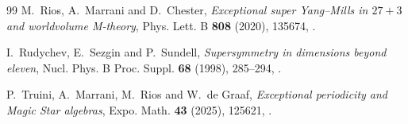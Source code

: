 \documentclass[11pt]{amsart}
\theoremstyle{remark}
\begin{document}
\begin{thebibliography}{99}
 M.~Rios, A.~Marrani and D.~Chester, \emph{Exceptional super Yang--Mills in $27+3$ and worldvolume M-theory}, Phys. Lett. B \textbf{808} (2020), 135674, .

 I.~Rudychev, E.~Sezgin and P.~Sundell, \emph{Supersymmetry in dimensions beyond eleven}, Nucl. Phys. B Proc. Suppl. \textbf{68} (1998), 285--294, .

 P.~Truini, A.~Marrani, M.~Rios and W.~de Graaf, \emph{Exceptional periodicity and Magic Star algebras}, Expo. Math. \textbf{43} (2025), 125621, .

\end{thebibliography}
\end{document}
